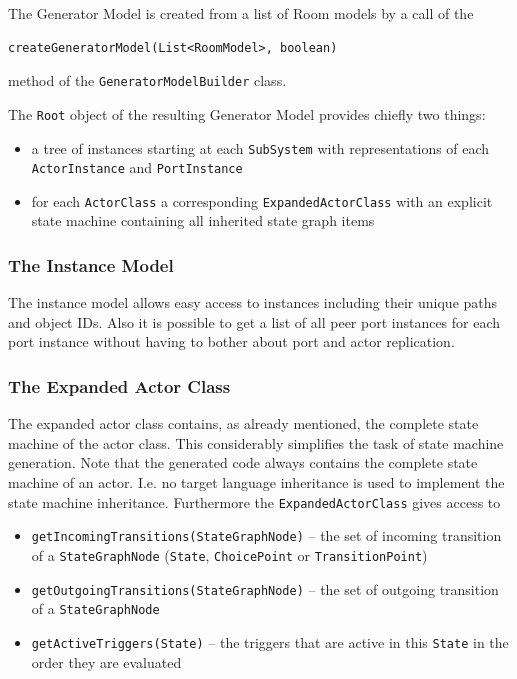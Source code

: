 The Generator Model is created from a list of Room models by a call of the

\begin{verbatim}createGeneratorModel(List<RoomModel>, boolean)\end{verbatim}

method of the \texttt{GeneratorModelBuilder} class.

The \texttt{Root} object of the resulting Generator Model provides chiefly two things:
\begin{itemize}
\item a tree of instances starting at each \texttt{SubSystem} with representations of each 
\texttt{ActorInstance} and \texttt{PortInstance}
\item for each \texttt{ActorClass} a corresponding \texttt{ExpandedActorClass} with an explicit state 
machine containing all inherited state graph items
\end{itemize}

\subsubsection{The Instance Model}

The instance model allows easy access to instances including their unique paths and object IDs. Also it is 
possible to get a list of all peer port instances for each port instance without having to bother about 
port and actor replication.

\subsubsection{The Expanded Actor Class}

The expanded actor class contains, as already mentioned, the complete state machine of the actor class. 
This considerably simplifies the task of state machine generation. Note that the generated code always 
contains the complete state machine of an actor. I.e. no target language inheritance is used to implement 
the state machine inheritance.
Furthermore the \texttt{ExpandedActorClass} gives access to
\begin{itemize}
\item \texttt{getIncomingTransitions(StateGraphNode)} -- the set of incoming transition of a 
\texttt{StateGraphNode} (\texttt{State}, \texttt{ChoicePoint} or \texttt{TransitionPoint})
\item \texttt{getOutgoingTransitions(StateGraphNode)} -- the set of outgoing transition of a 
\texttt{StateGraphNode}
\item \texttt{getActiveTriggers(State)} -- the triggers that are active in this \texttt{State} in the 
order they are evaluated
\end{itemize}

